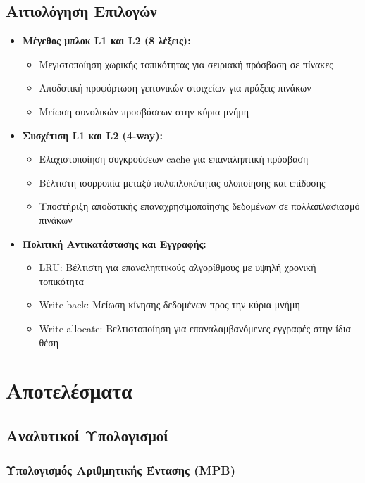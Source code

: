 \documentclass[11pt,a4paper]{article}
\begin{document}
\subsection{Αιτιολόγηση Επιλογών}
\begin{itemize}
    \item \textbf{Μέγεθος μπλοκ L1 και L2 (8 λέξεις):}
    \begin{itemize}
        \item Μεγιστοποίηση χωρικής τοπικότητας για σειριακή πρόσβαση σε πίνακες
        \item Αποδοτική προφόρτωση γειτονικών στοιχείων για πράξεις πινάκων
        \item Μείωση συνολικών προσβάσεων στην κύρια μνήμη
    \end{itemize}

    \item \textbf{Συσχέτιση L1 και L2 (4-way):}
    \begin{itemize}
        \item Ελαχιστοποίηση συγκρούσεων cache για επαναληπτική πρόσβαση
        \item Βέλτιστη ισορροπία μεταξύ πολυπλοκότητας υλοποίησης και επίδοσης
        \item Υποστήριξη αποδοτικής επαναχρησιμοποίησης δεδομένων σε πολλαπλασιασμό πινάκων
    \end{itemize}

    \item \textbf{Πολιτική Αντικατάστασης και Εγγραφής:}
    \begin{itemize}
        \item LRU: Βέλτιστη για επαναληπτικούς αλγορίθμους με υψηλή χρονική τοπικότητα
        \item Write-back: Μείωση κίνησης δεδομένων προς την κύρια μνήμη
        \item Write-allocate: Βελτιστοποίηση για επαναλαμβανόμενες εγγραφές στην ίδια θέση
    \end{itemize}
\end{itemize}

\section{Αποτελέσματα}

\subsection{Αναλυτικοί Υπολογισμοί}
\subsubsection{Υπολογισμός Αριθμητικής Έντασης (MPB)}
\end{document}
